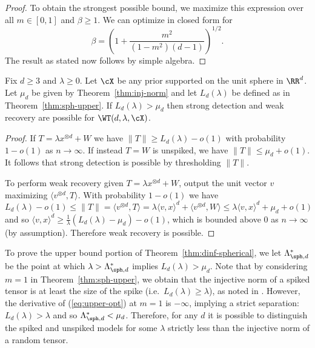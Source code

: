 \documentclass{article}
\begin{document}
\begin{proof}
\noindent To obtain the strongest possible bound, we maximize this expression over all $m \in [0,1]$ and $\beta \ge 1$. We can optimize in closed form for
$$ \beta = \left( 1 + \frac{m^2}{(1-m^2) (d-1)}\right)^{1/2}. $$
The result as stated now follows by simple algebra.
\end{proof}

\begin{corollary}
\label{cor:sph-upper}
Fix $d \ge 3$ and $\lambda \ge 0$. Let $\cX$ be any prior supported on the unit sphere in $\RR^d$. Let $\mu_d$ be given by Theorem~\ref{thm:inj-norm} and let $L_d(\lambda)$ be defined as in Theorem~\ref{thm:sph-upper}. If $L_d(\lambda) > \mu_d$ then strong detection and weak recovery are possible for $\WT(d,\lambda,\cX)$.
\end{corollary}

\begin{proof}
If $T = \lambda x^{\otimes d} + W$ we have $\|T\| \ge L_d(\lambda) - o(1)$ with probability $1-o(1)$ as $n\to\infty$. If instead $T = W$ is unspiked, we have $\|T\| \le \mu_d + o(1)$. It follows that strong detection is possible by thresholding $\|T\|$.

To perform weak recovery given $T = \lambda x^{\otimes d} + W$, output the unit vector $v$ maximizing $\langle v^{\otimes d},T \rangle$. With probability $1-o(1)$ we have
$$L_d(\lambda) - o(1) \le \|T\| = \langle v^{\otimes d},T \rangle = \lambda \langle v,x \rangle^d + \langle v^{\otimes d},W \rangle \le \lambda \langle v,x \rangle^d + \mu_d + o(1)$$
and so $\langle v,x \rangle^d \ge \frac{1}{\lambda} (L_d(\lambda) - \mu_d) - o(1)$, which is bounded above 0 as $n \to \infty$ (by assumption). Therefore weak recovery is possible.
\end{proof}

To prove the upper bound portion of Theorem~\ref{thm:dinf-spherical}, we let $\Lambda^*_{\sph,d}$ be the point at which $\lambda > \Lambda^*_{\sph,d}$ implies $L_d(\lambda) > \mu_d$. Note that by considering $m=1$ in Theorem~\ref{thm:sph-upper}, we obtain that the injective norm of a spiked tensor is at least the size of the spike (i.e.\ $L_d(\lambda) \ge \lambda$), as noted in \cite{rm}. However, the derivative of (\ref{eq:upper-opt}) at $m=1$ is $-\infty$, implying a strict separation: $L_d(\lambda) > \lambda$ and so $\Lambda^*_{\sph,d} < \mu_d$. Therefore, for any $d$ it is possible to distinguish the spiked and unspiked models for some $\lambda$ strictly less than the injective norm of a random tensor.
\end{document}
